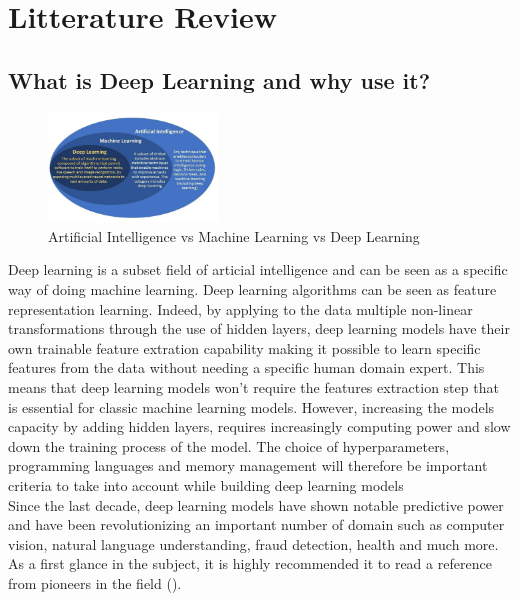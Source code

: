 \documentclass[6pt,letter]{article}\usepackage[]{graphicx}\usepackage[]{color}
\begin{document}
\section{Litterature Review}
\subsection{What is Deep Learning and why use it?}
\begin{figure}
  \begin{center}
    \includegraphics[width=0.4\textwidth]{deep learning.PNG}
      \end{center}
     \caption{Artificial Intelligence vs Machine Learning vs Deep Learning}
     \label{fig:simule}
\end{figure}

Deep learning is a subset field of articial intelligence and can be seen as a specific way of doing machine learning. Deep learning algorithms can be seen as feature representation learning. Indeed, by applying to the data multiple non-linear transformations through the use of hidden layers, deep learning models have their own trainable feature extration capability making it possible to learn specific features from the data without needing a specific human domain expert. This means that deep learning models won't require the features extraction step that is essential for classic machine learning models. However, increasing the models capacity by adding hidden layers, requires increasingly computing power and slow down the training process of the model. The choice of hyperparameters, programming languages and memory management will therefore be important criteria to take into account while building deep learning models\\
Since the last decade, deep learning models have shown notable predictive power and have been revolutionizing an important number of domain such as computer vision, natural language understanding, fraud detection, health and much more.\\
As a first glance in the subject, it is highly recommended it to read  a reference from pioneers in the field (\cite[Chapter 1]{Goodfellow-et-al-2016}).
\end{document}
